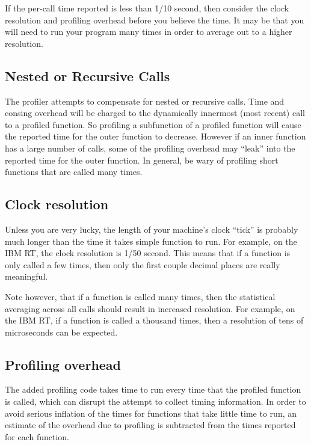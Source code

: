 If the per-call time reported is less than 1/10 second, then consider the clock
resolution and profiling overhead before you believe the time.  It may be that
you will need to run your program many times in order to average out to a
higher resolution.


\subsection{Nested or Recursive Calls}

The profiler attempts to compensate for nested or recursive calls.  Time and
consing overhead will be charged to the dynamically innermost (most recent)
call to a profiled function.  So profiling a subfunction of a profiled function
will cause the reported time for the outer function to decrease.  However if an
inner function has a large number of calls, some of the profiling overhead may
``leak'' into the reported time for the outer function.  In general, be wary of
profiling short functions that are called many times.


\subsection{Clock resolution}

Unless you are very lucky, the length of your machine's clock ``tick'' is
probably much longer than the time it takes simple function to run.  For
example, on the IBM RT, the clock resolution is 1/50 second.  This means that
if a function is only called a few times, then only the first couple decimal
places are really meaningful.  

Note however, that if a function is called many times, then the statistical
averaging across all calls should result in increased resolution.  For example,
on the IBM RT, if a function is called a thousand times, then a resolution of
tens of microseconds can be expected.

\subsection{Profiling overhead}

The added profiling code takes time to run every time that the profiled
function is called, which can disrupt the attempt to collect timing
information.  In order to avoid serious inflation of the times for functions
that take little time to run, an estimate of the overhead due to profiling is
subtracted from the times reported for each function.

